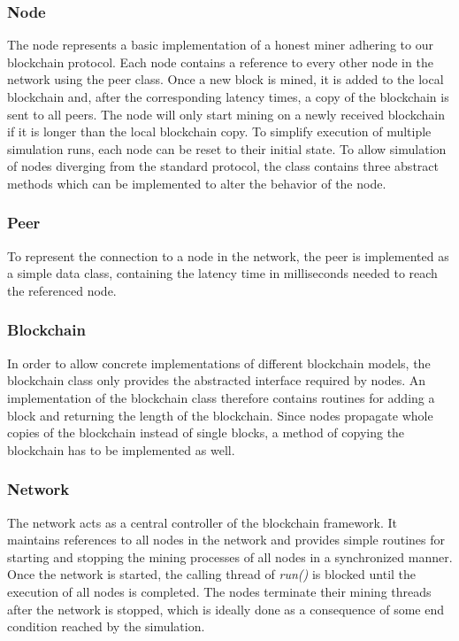 \documentclass[a4paper,12pt,twoside]{report}
\begin{document}
\subsubsection{Node}
The node represents a basic implementation of a honest miner adhering to our blockchain protocol. Each node contains a reference to every other node in the network using the peer class. Once a new block is mined, it is added to the local blockchain and, after the corresponding latency times, a copy of the blockchain is sent to all peers. The node will only start mining on a newly received blockchain if it is longer than the local blockchain copy. To simplify execution of multiple simulation runs, each node can be reset to their initial state. To allow simulation of nodes diverging from the standard protocol, the class contains three abstract methods which can be implemented to alter the behavior of the node. 

\subsubsection{Peer}
To represent the connection to a node in the network, the peer is implemented as a simple data class, containing the latency time in milliseconds needed to reach the referenced node.

\subsubsection{Blockchain}
In order to allow concrete implementations of different blockchain models, the blockchain class only provides the abstracted interface required by nodes. An implementation of the blockchain class therefore contains routines for adding a block and returning the length of the blockchain. Since nodes propagate whole copies of the blockchain instead of single blocks, a method of copying the blockchain has to be implemented as well.

\subsubsection{Network}
The network acts as a central controller of the blockchain framework. It maintains references to all nodes in the network and provides simple routines for starting and stopping the mining processes of all nodes in a synchronized manner. Once the network is started, the calling thread of \textit{run()} is blocked until the execution of all nodes is completed. The nodes terminate their mining threads after the network is stopped, which is ideally done as a consequence of some end condition reached by the simulation.
\end{document}
